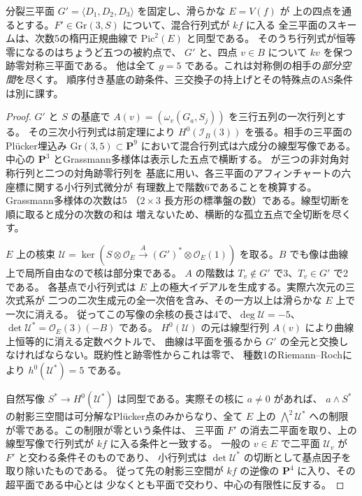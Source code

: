 \begin{theorem}\label{thm:marked-elliptic-complement-planes}
分裂三平面 $G'=\langle D_1,D_2,D_3\rangle$ を固定し、滑らかな $E=V(f)$ が
上の四点を通るとする。$F'\in\mathrm{Gr}(3,S)$ について、混合行列式が $kf$ に入る
全三平面のスキームは、次数5の楕円正規曲線で $\mathrm{Pic}^2(E)$ と同型である。
そのうち行列式が恒等零になるのはちょうど五つの被約点で、
$G'$ と、四点 $v\in B$ について $kv$ を保つ跡零対称三平面である。
他は全て $g=5$ である。これは対称側の相手の\emph{部分空間}を尽くす。
順序付き基底の跡条件、三交換子の持上げとその特殊点のAS条件は別に課す。
\end{theorem}
\begin{proof}
$G'$ と $S$ の基底で $A(v)=(\omega_v(G_a,S_j))$ を三行五列の一次行列とする。
その三次小行列式は前定理により $H^0(\mathcal I_B(3))$ を張る。相手の三平面の
Pl\"ucker埋込み $\mathrm{Gr}(3,5)\subset\mathbf P^9$ において混合行列式は六成分の線型写像である。
中心の $\mathbf P^3$ とGrassmann多様体は表示した五点で横断する。
が三つの非対角対称行列と二つの対角跡零行列を
基底に用い、各三平面のアフィンチャートの六座標に関する小行列式微分が
有理数上で階数6であることを検算する。Grassmann多様体の次数は5
（$2\times3$ 長方形の標準盤の数）である。線型切断を順に取ると成分の次数の和は
増えないため、横断的な孤立五点で全切断を尽くす。

$E$ 上の核束 $\mathcal U=\ker(S\otimes\mathcal O_E\xrightarrow A (G')^*\otimes\mathcal O_E(1))$
を取る。$B$ でも像は曲線上で局所自由なので核は部分束である。
$A$ の階数は $T_v\notin G'$ で3、$T_v\in G'$ で2である。
各基点で小行列式は $E$ 上の極大イデアルを生成する。実際六次元の三次式系が
二つの二次生成元の全一次倍を含み、その一方以上は滑らかな $E$ 上で一次に消える。
従ってこの写像の余核の長さは4で、$\deg\mathcal U=-5$、
$\det\mathcal U^*=\mathcal O_E(3)(-B)$ である。
$H^0(\mathcal U)$ の元は線型行列 $A(v)$ により曲線上恒等的に消える定数ベクトルで、
曲線は平面を張るから $G'$ の全元と交換しなければならない。既約性と跡零性からこれは零で、
種数1のRiemann--Rochにより $h^0(\mathcal U^*)=5$ である。

自然写像 $S^*\to H^0(\mathcal U^*)$ は同型である。実際その核に $a\ne0$ があれば、
$a\wedge S^*$ の射影三空間は可分解なPl\"ucker点のみからなり、全て $E$ 上の
$\bigwedge^2\mathcal U^*$ への制限が零である。この制限が零という条件は、
三平面 $F'$ の消去二平面を取り、上の線型写像で行列式が $kf$ に入る条件と一致する。
一般の $v\in E$ で二平面 $\mathcal U_v$ が $F'$ と交わる条件そのものであり、
小行列式は $\det\mathcal U^*$ の切断として基点因子を取り除いたものである。
従って先の射影三空間が $kf$ の逆像の $\mathbf P^4$ に入り、その超平面である中心とは
少なくとも平面で交わり、中心の有限性に反する。


\end{proof}
